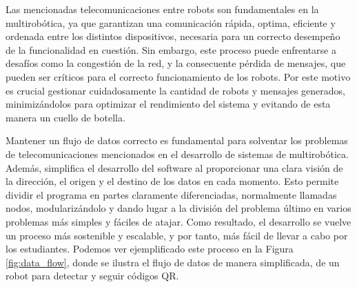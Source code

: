 Las mencionadas telecomunicaciones entre robots son fundamentales en la
multirobótica, ya que garantizan una comunicación rápida, optima,
eficiente y ordenada entre los distintos dispositivos, necesaria para un
correcto desempeño de la funcionalidad en cuestión.
Sin embargo, este proceso puede enfrentarse a desafíos como la congestión de la
red, y la consecuente pérdida de mensajes, que pueden ser críticos para el
correcto funcionamiento de los robots.
Por este motivo es crucial gestionar cuidadosamente la cantidad de robots y
mensajes generados, minimizándolos para optimizar el rendimiento del sistema y
evitando de esta manera un cuello de botella.

Mantener un flujo de datos correcto es fundamental para solventar los problemas
de telecomunicaciones mencionados en el desarrollo de sistemas de multirobótica.
Además, simplifica el desarrollo del software al proporcionar una clara visión
de la dirección, el origen y el destino de los datos en cada momento.
Esto permite dividir el programa en partes claramente diferenciadas, normalmente
llamadas nodos, modularizándolo y dando lugar a la división del problema último
en varios problemas más simples y fáciles de atajar.
Como resultado, el desarrollo se vuelve un proceso más sostenible y escalable, y
por tanto, más fácil de llevar a cabo por los estudiantes. Podemos ver
ejemplificado este proceso en la Figura \ref{fig:data_flow}, donde se ilustra
el flujo de datos de manera simplificada, de un robot para detectar y seguir
códigos QR.

